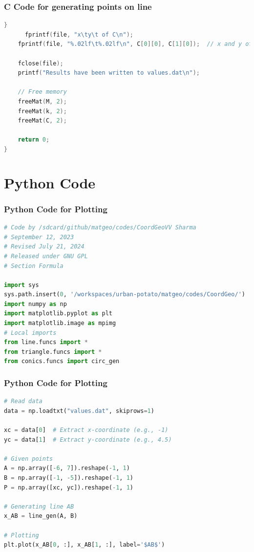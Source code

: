 \documentclass{beamer}
\theoremstyle{remark}
\numberwithin{equation}{section}
\begin{document}
\begin{frame}[fragile]
\frametitle{C Code for generating points on line}
\begin{lstlisting}[language=C]
     }
      fprintf(file, "x\ty\t of C\n");
    fprintf(file, "%.02lf\t%.02lf\n", C[0][0], C[1][0]);  // x and y of C

    fclose(file);
    printf("Results have been written to values.dat\n");

    // Free memory
    freeMat(M, 2);
    freeMat(k, 2);
    freeMat(C, 2);

    return 0;
}
\end{lstlisting}
\end{frame}

\section{Python Code}
\begin{frame}[fragile]
\frametitle{Python Code for Plotting}
\begin{lstlisting}[language=Python]
# Code by /sdcard/github/matgeo/codes/CoordGeoVV Sharma
# September 12, 2023
# Revised July 21, 2024
# Released under GNU GPL
# Section Formula

import sys
sys.path.insert(0, '/workspaces/urban-potato/matgeo/codes/CoordGeo/')  # path to my scripts
import numpy as np
import matplotlib.pyplot as plt
import matplotlib.image as mpimg
# Local imports
from line.funcs import *
from triangle.funcs import *
from conics.funcs import circ_gen

\end{lstlisting}
\end{frame}

\begin{frame}[fragile]
\frametitle{Python Code for Plotting}
\begin{lstlisting}[language=Python]
# Read data
data = np.loadtxt("values.dat", skiprows=1)

xc = data[0]  # Extract x-coordinate (e.g., -1)
yc = data[1]  # Extract y-coordinate (e.g., 4.5)

# Given points
A = np.array([-6, 7]).reshape(-1, 1)
B = np.array([-1, -5]).reshape(-1, 1)
P = np.array([xc, yc]).reshape(-1, 1)

# Generating line AB
x_AB = line_gen(A, B)

# Plotting
plt.plot(x_AB[0, :], x_AB[1, :], label='$AB$')

\end{lstlisting}
\end{frame}
\end{document}
